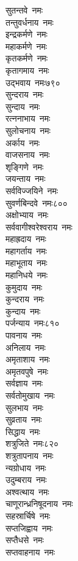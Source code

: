 \begin{multicols}{\maxColumns}
\begin{flushleft}
सुतन्तवे~नमः\\
तन्तुवर्धनाय~नमः\\
इन्द्रकर्मणे~नमः\\
महाकर्मणे~नमः\\
कृतकर्मणे~नमः\\
कृतागमाय~नमः\\
उद्भवाय~नमः\hfill ७९०\\
सुन्दराय~नमः\\
सुन्दाय~नमः\\
रत्ननाभाय~नमः\\
सुलोचनाय~नमः\\
अर्काय~नमः\\
वाजसनाय~नमः\\
शृङ्गिणे~नमः\\
जयन्ताय~नमः\\
सर्वविज्जयिने~नमः\\
सुवर्णबिन्दवे~नमः\hfill ८००\\
अक्षोभ्याय~नमः\\
सर्ववागीश्वरेश्वराय~नमः\\
महाह्रदाय~नमः\\
महागर्ताय~नमः\\
महाभूताय~नमः\\
महानिधये~नमः\\
कुमुदाय~नमः\\
कुन्दराय~नमः\\
कुन्दाय~नमः\\
पर्जन्याय~नमः\hfill ८१०\\
पावनाय~नमः\\
अनिलाय~नमः\\
अमृताशाय~नमः\\
अमृतवपुषे~नमः\\
सर्वज्ञाय~नमः\\
सर्वतोमुखाय~नमः\\
सुलभाय~नमः\\
सुव्रताय~नमः\\
सिद्धाय~नमः\\
शत्रुजिते~नमः\hfill ८२०\\
शत्रुतापनाय~नमः\\
न्यग्रोधाय~नमः\\
उदुम्बराय~नमः\\
अश्वत्थाय~नमः\\
चाणूरान्ध्रनिषूदनाय~नमः\\
सहस्रार्चिषे~नमः\\
सप्तजिह्वाय~नमः\\
सप्तैधसे~नमः\\
सप्तवाहनाय~नमः\\

\end{flushleft}
\end{multicols}
